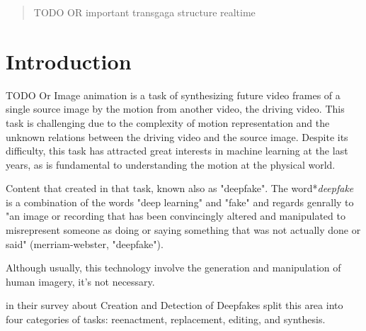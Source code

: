\documentclass{article}
\begin{document}
\printAffiliationsAndNotice{}  %

\begin{abstract}
TODO OR
important
transgaga structure
realtime
\cite{siarohin2020order}
\end{abstract}

\section{Introduction}
TODO Or
Image animation is a task of synthesizing future video frames of a single source image by the motion from another video, the driving video. This task is challenging due to the complexity of motion representation and the unknown relations between the driving video and the source image. 
Despite its difficulty, this
task has attracted great interests in machine learning at the last years, as  is fundamental to
understanding the motion at the physical world.

Content that created in that task, known also as "deepfake". The word*\textit{deepfake} is a combination of the words "deep learning" and "fake" and regards genrally to "an image or recording that has been convincingly altered and manipulated to misrepresent someone as doing or saying something that was not actually done or said" (merriam-webster, "deepfake").

Although usually, this technology involve the generation and manipulation of human imagery, it's not necessary. 


\cite{10.1145/3425780} in their survey about Creation and Detection of Deepfakes split this area into four categories of tasks:
reenactment, replacement, editing,
and synthesis. 
\end{document}
